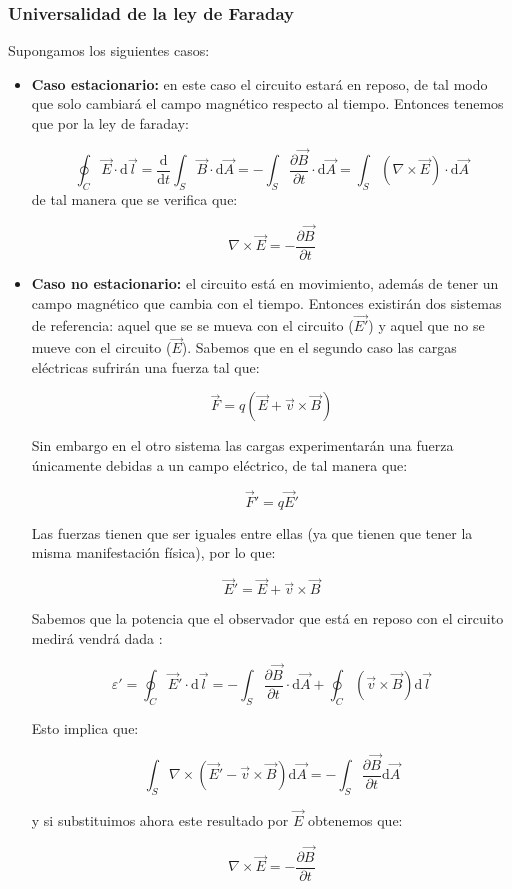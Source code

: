 \documentclass[12pt]{article}
\newcommand{\parciales}[2]{\frac{\partial #1}{\partial #2}}
\newcommand{\D}{\mathrm{d}}
\begin{document}
\subsubsection{Universalidad de la ley de Faraday}

Supongamos los siguientes casos:

\begin{itemize}

\item \textbf{Caso estacionario:} en este caso el circuito estará en reposo, de tal modo que solo cambiará el campo magnético respecto al tiempo. Entonces tenemos que por la ley de faraday:

$$
\oint_C \vec{E} \cdot \D \vec{l} = \dfrac{\D }{\D t} \int_S \vec{B} \cdot \D \vec{A} = - \int_S \parciales{\vec{B}}{t} \cdot \D \vec{A} = \int_S (\nabla \times \vec{E}) \cdot \D \vec{A} 
$$ 
de tal manera que se verifica que:

\begin{equation}
\nabla \times \vec{E} = - \parciales{\vec{B}}{t}
\end{equation}


\item \textbf{Caso no estacionario:} el circuito está en movimiento, además de tener un campo magnético que cambia con el tiempo. Entonces existirán dos sistemas de referencia: aquel que se se mueva con el circuito ($\vec{E'}$) y aquel que no se mueve con el circuito ($\vec{E}$). Sabemos que en el segundo caso las cargas eléctricas sufrirán una fuerza tal que:

$$
\vec{F} = q (\vec{E}+\vec{v} \times \vec{B})
$$

Sin embargo en el otro sistema las cargas experimentarán una fuerza únicamente debidas a un campo eléctrico, de tal manera que:

$$
\vec{F}' = q \vec{E}'
$$

Las fuerzas tienen que ser iguales entre ellas (ya que tienen que tener la misma manifestación física), por lo que:

$$
\vec{E}' = \vec{E} + \vec{v} \times \vec{B}
$$

Sabemos que la potencia que el observador que está en reposo con el circuito medirá vendrá dada : 

$$
\varepsilon' = \oint_C \vec{E}' \cdot \D \vec{l} = - \int_S \parciales{\vec{B}}{t} \cdot \D \vec{A} + \oint_C (\vec{v} \times \vec{B}) \D \vec{l}
$$

Esto implica que:

$$
\int_S \nabla \times (\vec{E}' - \vec{v} \times \vec{B}) \D \vec{A} =  - \int_S \parciales{\vec{B}}{t} \D \vec{A}
$$

y si substituimos ahora este resultado por $\vec{E}$ obtenemos que:

\begin{equation}
\nabla \times \vec{E} = - \parciales{\vec{B}}{t}
\end{equation}

\end{itemize}
\end{document}
